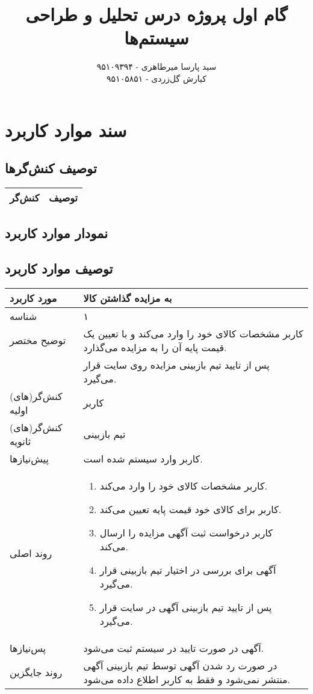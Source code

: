 \documentclass{article}
\title{\textbf{گام اول پروژه درس تحلیل و طراحی سیستم‌ها}}
\author{سید پارسا میرطاهری - ۹۵۱۰۹۳۹۴ \\ کیارش گل‌زردی - ۹۵۱۰۵۸۵۱}
\begin{document}
\date{}

\maketitle

\section{سند موارد کاربرد}

\subsection{توصیف کنش‌گرها}

\begin{center}
\begin{tabular} {|c|c|}
\hline
کنش‌گر & توصیف \\
\hline	
\end{tabular}	
\end{center}

\subsection{نمودار موارد کاربرد}

\subsection{توصیف موارد کاربرد}

\begin{center}
\begin{tabular} {|p{}|p{}|}
\hline
 مورد کاربرد & 
 به مزایده گذاشتن کالا
\\ \hline
 شناسه &
۱
\\ \hline
توضیح مختصر &
کاربر مشخصات کالای خود را وارد می‌کند و با تعیین یک قیمت پایه آن را به مزایده می‌گذارد.
\\
&
پس از تایید تیم بازبینی مزایده روی سایت قرار می‌گیرد.
\\ \hline
کنش‌گر(های) اولیه &
کاربر
\\ \hline
کنش‌گر(های) ثانویه &
تیم بازبینی
\\ \hline
پیش‌نیازها &
کاربر وارد سیستم شده است.
\\ \hline
روند اصلی &
\begin{enumerate}
\item
کاربر مشخصات کالای خود را وارد می‌کند.
\item
کاربر برای کالای خود قیمت پایه تعیین می‌کند.
\item
کاربر درخواست ثبت آگهی مزایده را ارسال می‌کند.
\item
آگهی برای بررسی در اختیار تیم بازبینی قرار می‌گیرد.
\item
پس از تایید تیم بازبینی آگهی در سایت قرار می‌گیرد.
\end{enumerate}
\\ \hline
پس‌نیازها &
آگهی در صورت تایید در سیستم ثبت می‌شود.
\\ \hline
روند جایگزین &
در صورت رد شدن آگهی توسط تیم بازبینی آگهی منتشر نمی‌شود و فقط به کاربر اطلاع داده می‌شود. 
\\ \hline
\end{tabular}
\end{center}
\end{document}
